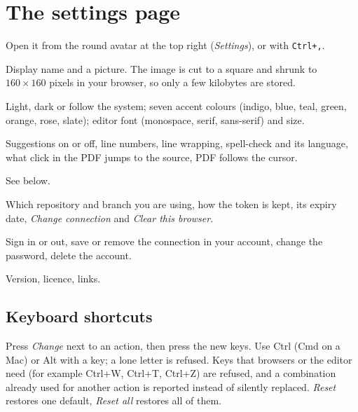 \documentclass[11pt,a4paper]{article}
\newcommand{\key}[1]{\texttt{\small #1}}
\begin{document}
\section{The settings page}
Open it from the round avatar at the top right (\emph{Settings}), or with \key{Ctrl+,}.
\begin{description}[leftmargin=3.2cm,style=nextline]
  \item[Profile] Display name and a picture. The image is cut to a square and shrunk to $160\times160$ pixels in your browser, so only a few kilobytes are stored.
  \item[Appearance] Light, dark or follow the system; seven accent colours (indigo, blue, teal, green, orange, rose, slate); editor font (monospace, serif,
        sans-serif) and size.
  \item[Editor] Suggestions on or off, line numbers, line wrapping, spell-check and its language, what click in the PDF jumps to the source, PDF follows the cursor.
  \item[Shortcuts] See below.
  \item[Connection] Which repository and branch you are using, how the token is kept, its expiry date, \emph{Change connection} and \emph{Clear this browser}.
  \item[Account] Sign in or out, save or remove the connection in your account, change the password, delete the account.
  \item[About] Version, licence, links.
\end{description}

\subsection{Keyboard shortcuts}
Press \emph{Change} next to an action, then press the new keys. Use Ctrl (Cmd on a Mac) or Alt with a key; a lone letter is refused. Keys that browsers or the
editor need (for example Ctrl+W, Ctrl+T, Ctrl+Z) are refused, and a combination already used for another action is reported instead of silently replaced.
\emph{Reset} restores one default, \emph{Reset all} restores all of them.
\end{document}
